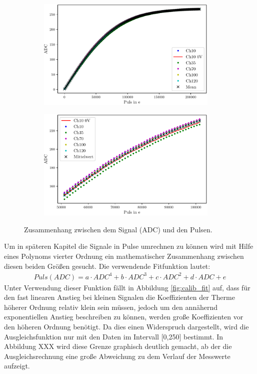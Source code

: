 \begin{figure}[H]
\centering
\begin{subfigure}{.5\textwidth}
	\centering
	\includegraphics[width=0.95\textwidth]{build/Calib.pdf}
	\caption{}
	\label{fig:calib}
\end{subfigure}%
\begin{subfigure}{.5\textwidth}
	\centering
	\includegraphics[width=0.95\textwidth]{build/Calib_detail.pdf}
	\caption{}
	\label{fig:calib_detail}
\end{subfigure}
\caption{Zusammenhang zwischen dem Signal (ADC) und den Pulsen.}
\label{fig:calib}
\end{figure}

Um in späteren Kapitel die Signale in Pulse umrechnen zu können wird mit Hilfe eines Polynoms vierter Ordnung ein mathematischer Zusammenhang zwischen diesen beiden Größen gesucht.
Die verwendende Fitfunktion lautet:
\begin{align}
	Puls(ADC)=a \cdot ADC^4 + b \cdot ADC^3 + c \cdot ADC^2 + d \cdot ADC + e 
\end{align} 
Unter Verwendung dieser Funktion fällt in Abbildung \ref{fig:calib_fit} auf, dass für den fast linearen Anstieg bei kleinen Signalen die Koeffizienten der Therme höherer Ordnung relativ klein sein müssen, jedoch um den annähernd exponentiellen Anstieg beschreiben zu können, werden große Koeffizienten vor den höheren Ordnung benötigt. Da dies einen Widerspruch dargestellt, wird die Ausgleichsfunktion nur mit den Daten im Intervall [0,250] bestimmt. In Abbildung XXX wird diese Grenze graphisch deutlich gemacht, ab der die Ausgleichsrechnung eine große Abweichung zu dem Verlauf der Messwerte aufzeigt.

